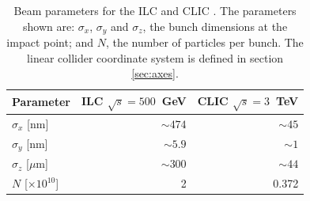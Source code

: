 \begin{table}[h!]
\centering
\begin{tabular}{ l r r }
\hline
Parameter & ILC $\sqrt{s} = 500$~GeV & CLIC $\sqrt{s} = 3$~TeV \\
\hline
$\sigma_{x}$ [nm] & $\sim 474$ & $\sim 45$ \\
$\sigma_{y}$ [nm] & $\sim 5.9$ & $\sim 1$ \\
$\sigma_{z}$ [$\mu$m]& $\sim 300$ & $\sim 44$ \\
$N$ [$\times 10^{10}$] & 2 & 0.372 \\
\hline
\end{tabular}
\caption[Beam parameters for the ILC \cite{Behnke:2013xla} and CLIC \cite{Linssen:2012hp}.  The parameters shown are: $\sigma_{x}$, $\sigma_{y}$ and $\sigma_{z}$, the bunch dimensions at the impact point; and $N$, the number of particles per bunch.  The linear collider coordinate system is defined in section \ref{sec:axes}.]{Beam parameters for the ILC \cite{Behnke:2013xla} and CLIC \cite{Linssen:2012hp}.  The parameters shown are: $\sigma_{x}$, $\sigma_{y}$ and $\sigma_{z}$, the bunch dimensions at the impact point; and $N$, the number of particles per bunch.  The linear collider coordinate system is defined in section \ref{sec:axes}.}
\label{table:clicbeam}
\end{table}


